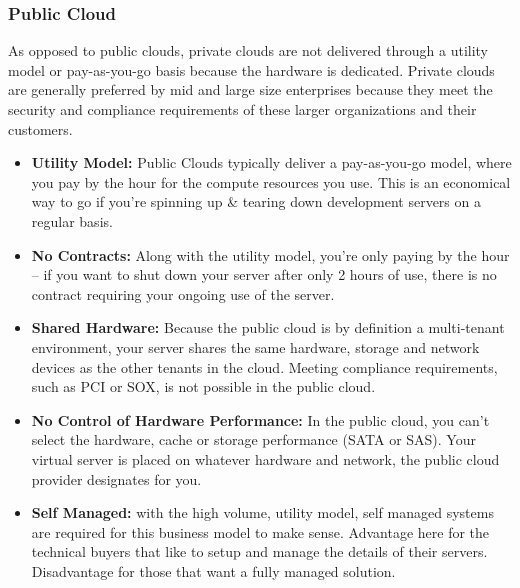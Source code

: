 \documentclass[a4,12pt]{scrartcl}
\begin{document}
\subsubsection{Public Cloud}
As opposed to public clouds, private clouds are not delivered through a utility model or pay-as-you-go basis because the hardware is dedicated. Private clouds are generally preferred by mid and large size enterprises because they meet the security and compliance requirements of these larger organizations and their customers.
\begin{itemize}
\item\textbf{Utility Model:} Public Clouds typically deliver a pay-as-you-go model, where you pay by the hour for the compute resources you use. This is an economical way to go if you’re spinning up \& tearing down development servers on a regular basis.
\item \textbf{No Contracts:} Along with the utility model, you’re only paying by the hour – if you want to shut down your server after only 2 hours of use, there is no contract requiring your ongoing use of the server.
\item \textbf{Shared Hardware:} Because the public cloud is by definition a multi-tenant environment, your server shares the same hardware, storage and network devices as the other tenants in the cloud. Meeting compliance requirements, such as PCI or SOX, is not possible in the public cloud. 
\item \textbf{No Control of Hardware Performance:} In the public cloud, you can’t select the hardware, cache or storage performance (SATA or SAS). Your virtual server is placed on whatever hardware and network, the public cloud provider designates for you.
\item \textbf{Self Managed:} with the high volume, utility model, self managed systems are required for this business model to make sense. Advantage here for the technical buyers that like to setup and manage the details of their servers. Disadvantage for those that want a fully managed solution.
\end{itemize}
\end{document}
